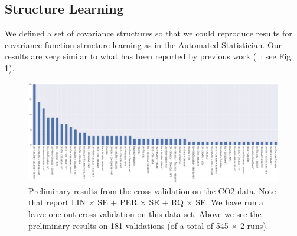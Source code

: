 \documentclass{article} %
\begin{document}
\subsection{Structure Learning}
We defined a set of covariance structures so that we could reproduce results for covariance function structure learning as in the Automated Statistician. Our results are very similar to what has been reported by previous work (~\citealp*{duvenaud2013structure}; see Fig. \ref{fig:structure}).
\begin{figure}[p]

\centering
    \includegraphics[width=\textwidth]{figs/prelimCO2structure.png}
    \caption{Preliminary results from the cross-validation on the CO2 data. Note that \citet{duvenaud2013structure} report LIN $\times$ SE $+$ PER $\times$ SE $+$ RQ $\times$ SE. We have run a leave one out cross-validation on this data set. Above we see the preliminary results on 181 validations (of a total of 545 $\times$ 2 runs).}\label{fig:structure}
\end{figure}
\end{document}
